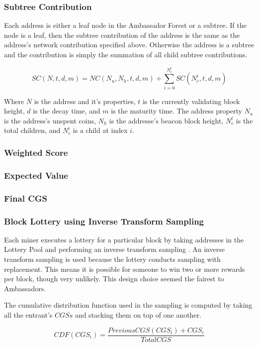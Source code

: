 \documentclass{article}
\begin{document}
\subsubsection{Subtree Contribution}

Each address is either a leaf node in the Ambassador Forest or a subtree. If the
node is a leaf, then the subtree contribution of the address is the same as
the address's network contribution specified above. Otherwise the address is
a subtree and the contribution is simply the summation of all child subtree
contributions.

$$SC(N,t,d,m) = NC(N_u,N_h,t,d,m) + \sum_{i=0}^{N_c^t} SC(N_c^i,t,d,m)$$ 

Where $N$ is the address and it's properties, $t$ is the currently validating
block height, $d$ is the decay time, and $m$ is the maturity time.
The address property $N_u$ is the address's unspent coins, $N_h$
is the addresse's beacon block height, $N_c^t$ is the total children, and 
$N_c^i$ is a child at index $i$.

\subsubsection{Weighted Score}
\subsubsection{Expected Value}
\subsubsection{Final CGS}

\subsubsection{Block Lottery using Inverse Transform Sampling}

Each miner executes a lottery for a particular block by taking addresses in
the Lottery Pool and performing an inverse transform sampling \cite{inverse}.
An inverse transform sampling is used because the lottery conducts sampling
with replacement. This means it is possible for someone to win two or more
rewards per block, though very unlikely. This design choice seemed the fairest to
Ambassadors.

The cumulative distribution function used in the sampling is computed by taking
all the entrant's $CGSs$ and stacking them on top of one another.

$$CDF(CGS_i) = \frac{PreviousCGS(CGS_i) + CGS_i}{TotalCGS}$$
\end{document}
